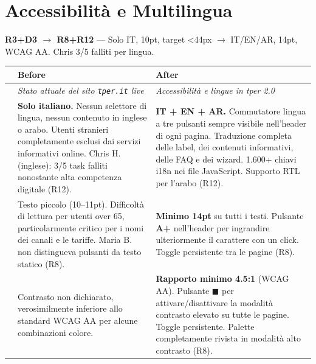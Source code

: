 \vspace{0.3cm}

\section{Accessibilità e Multilingua}
\label{sec:comparison-a11y}

\textbf{R3+D3 $\rightarrow$ R8+R12} --- Solo IT, 10pt, target <44px $\rightarrow$ IT/EN/AR, 14pt, WCAG AA. Chris 3/5 falliti per lingua.

\begin{table}[H]
\centering
\small
\renewcommand{\arraystretch}{1.4}
\begin{tabular}{|p{0.5cm}|p{7cm}|p{7cm}|}
\hline
& \textbf{Before} & \textbf{After} \\ \hline
\cellcolor{primaryColor!15} &
\textit{Stato attuale del sito \texttt{tper.it} live} &
\textit{Accessibilità e lingue in tper 2.0} \\ \hline

\raisebox{0.5cm}{\rotatebox{90}{\textbf{Lingua}}} &
\textbf{Solo italiano.} Nessun selettore di lingua, nessun contenuto in inglese o arabo. Utenti stranieri completamente esclusi dai servizi informativi online. Chris H. (inglese): 3/5 task falliti nonostante alta competenza digitale (R12). &
\textbf{IT + EN + AR.} Commutatore lingua a tre pulsanti sempre visibile nell'header di ogni pagina. Traduzione completa delle label, dei contenuti informativi, delle FAQ e dei wizard. 1.600+ chiavi i18n nei file JavaScript. Supporto RTL per l'arabo (R12). \\ \hline

\raisebox{0.5cm}{\rotatebox{90}{\textbf{Carattere}}} &
Testo piccolo (10--11pt). Difficoltà di lettura per utenti over 65, particolarmente critico per i nomi dei canali e le tariffe. Maria B. non distingueva pulsanti da testo statico (R8). &
\textbf{Minimo 14pt} su tutti i testi. Pulsante \textbf{A+} nell'header per ingrandire ulteriormente il carattere con un click. Toggle persistente tra le pagine (R8). \\ \hline

\raisebox{0.5cm}{\rotatebox{90}{\textbf{Contrasto}}} &
Contrasto non dichiarato, verosimilmente inferiore allo standard WCAG AA per alcune combinazioni colore. &
\textbf{Rapporto minimo 4.5:1} (WCAG AA). Pulsante \textbf{$\blacksquare$} per attivare/disattivare la modalità contrasto elevato su tutte le pagine. Toggle persistente. Palette completamente rivista in modalità alto contrasto (R8). \\ \hline



\end{tabular}
\end{table}
